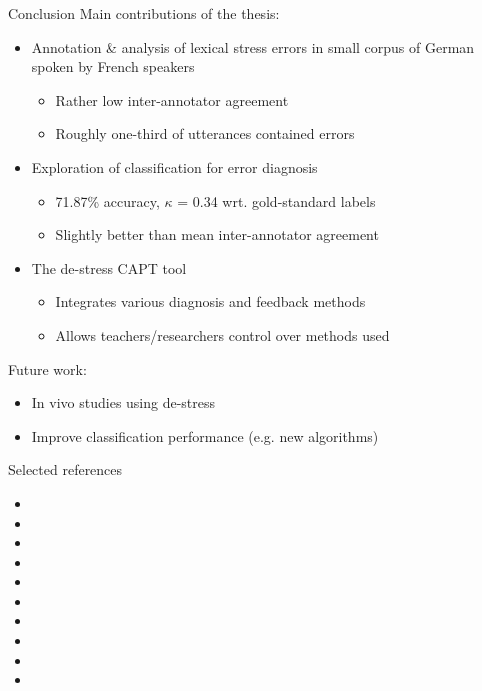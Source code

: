 \documentclass[xcolor={dvipsnames}]{beamer}
\renewcommand{\footnotesize}{\scriptsize}
\begin{document}
		\begin{frame}{Conclusion}
		Main contributions of the thesis:
		\begin{itemize}
		\pause
		\item Annotation \& analysis of lexical stress errors in small corpus of German spoken by French speakers
			\begin{itemize}
			\item Rather low inter-annotator agreement
			\item Roughly one-third of utterances contained errors
			\end{itemize}
			
		\pause
		\item Exploration of classification for error diagnosis
			\begin{itemize}
			\item 71.87\% accuracy, $\kappa$ = 0.34 wrt. gold-standard labels
			\item Slightly better than mean inter-annotator agreement
			\end{itemize}
		
		\pause
		\item The de-stress CAPT tool
			\begin{itemize}
			\item Integrates various diagnosis and feedback methods
			\item Allows teachers/researchers control over methods used
			\end{itemize}
		\end{itemize}
		\pause
		\vfill
		Future work:
		\begin{itemize}
			\item In vivo studies using de-stress
			\item Improve classification performance (e.g. new algorithms)
		\end{itemize}
		\end{frame}

\begin{frame}{Selected references}

{\scriptsize
	\begin{itemize}
	\item {}
	\item {}
	\item {}
	\item {}
	\item {}
	\item {}
	\item {}
	\item {}
	\item {}
	\item {}
	\end{itemize}
}
\end{frame}
 
\end{document}
